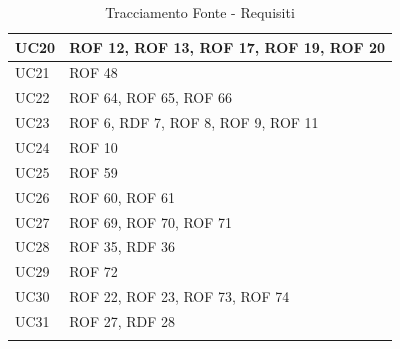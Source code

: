 \documentclass[12pt, oneside]{article}
\begin{document}
\begin{longtable}{|p{4cm}|p{12cm}|}
    \hline
    UC20 & ROF 12, ROF 13, ROF 17, ROF 19, ROF 20\\
    \hline
    UC21 & ROF 48 \\
    \hline
    UC22 & ROF 64, ROF 65, ROF 66 \\
    \hline
    UC23 & ROF 6, RDF 7, ROF 8, ROF 9, ROF 11 \\
    \hline
    UC24 & ROF 10\\
    \hline
    UC25 & ROF 59 \\
    \hline
    UC26 & ROF 60, ROF 61 \\
    \hline
    UC27 & ROF 69, ROF 70, ROF 71 \\
    \hline
    UC28 & ROF 35, RDF 36 \\
    \hline
    UC29 & ROF 72 \\
    \hline
    UC30 & ROF 22, ROF 23, ROF 73, ROF 74 \\
    \hline
    UC31 & ROF 27, RDF 28 \\
    \hline

\caption{Tracciamento Fonte - Requisiti}
    
\end{longtable}
\end{document}
